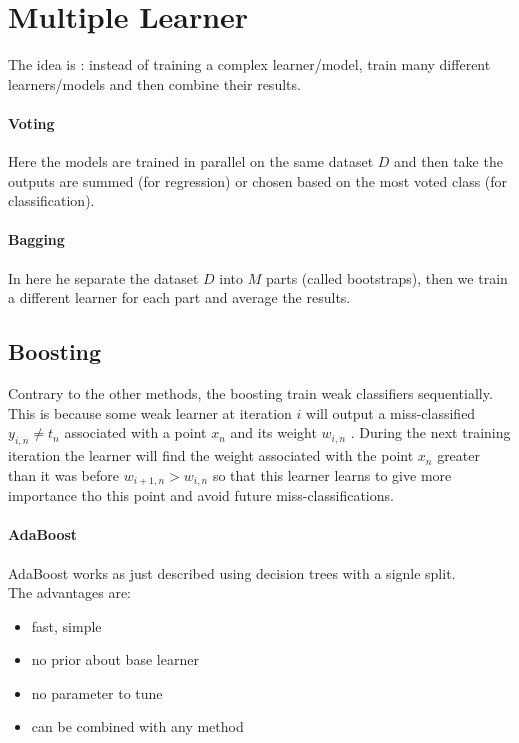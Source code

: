 \section{Multiple Learner}
The idea is : instead of training a complex learner/model, train many different learners/models and then combine their results.

\paragraph{Voting}
Here the models are trained in parallel on the same dataset $D$ and then take the outputs are summed (for regression) or chosen based on the most voted class (for classification).

\paragraph{Bagging}
In here he separate the dataset $D$ into $M$ parts (called bootstraps), then we train a different learner for each part and average the results.

\subsection{Boosting}
Contrary to the other methods, the boosting train weak classifiers sequentially. This is because some weak learner at iteration $i$ will output a miss-classified $y_{i,n} \ne t_n$ associated with a point $x_n$ and its weight $w_{i,n}$ . During the next training iteration the learner will find the weight associated with the point $x_n$  greater than it was before $w_{i+1,n} >w_{i,n}$ so that this learner learns to give more importance tho this point and avoid future miss-classifications.

\paragraph{AdaBoost}
AdaBoost works as just described using decision trees with a signle split.\\

The advantages are:
\begin{itemize}
\item fast, simple
\item no prior  about base learner
\item no parameter to tune
\item can be combined with any method
\end{itemize}

